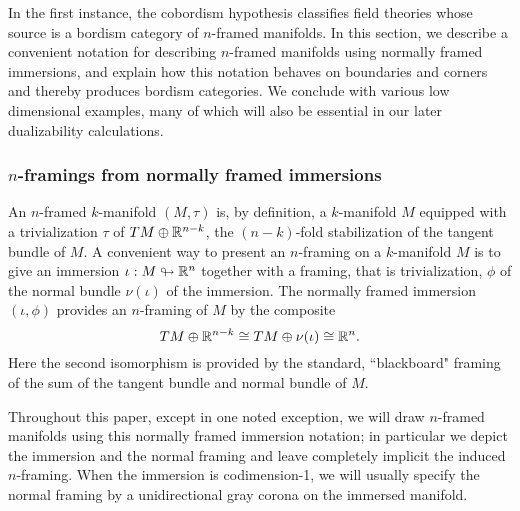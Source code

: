 \documentclass{amsart}
\begin{document}
In the first instance, the cobordism hypothesis classifies field theories whose source is a bordism category of $n$-framed manifolds.  In this section, we describe a convenient notation for describing $n$-framed manifolds using normally framed immersions, and explain how this notation behaves on boundaries and corners and thereby produces bordism categories.  We conclude with various low dimensional examples, many of which will also be essential in our later dualizability calculations.

\subsubsection{$n$-framings from normally framed immersions}

An $n$-framed $k$-manifold $(M,\tau)$ is, by definition, a $k$-manifold $M$ equipped with a trivialization $\tau$ of $TM \oplus \mathbb R^{n-k}$, the $(n-k)$-fold stabilization of the tangent bundle of $M$.  A convenient way to present an $n$-framing on a $k$-manifold $M$ is to give an immersion $\iota: M \looparrowright \mathbb R^n$ together with a framing, that is trivialization, $\phi$ of the normal bundle $\nu(\iota)$ of the immersion.  The normally framed immersion $(\iota, \phi)$ provides an $n$-framing of $M$ by the composite
\[
TM \oplus \mathbb R^{n-k} \cong TM \oplus \nu(\iota) \cong \mathbb R^n.
\]
Here the second isomorphism is provided by the standard, ``blackboard" framing of the sum of the tangent bundle and normal bundle of $M$.

Throughout this paper, except in one noted exception, we will draw $n$-framed manifolds using this normally framed immersion notation; in particular we depict the immersion and the normal framing and leave completely implicit the induced $n$-framing.  When the immersion is codimension-1, we will usually specify the normal framing by a unidirectional gray corona on the immersed manifold.
\end{document}
